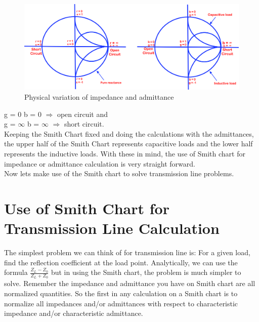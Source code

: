\begin{figure}[h]
\centering
\includegraphics[width=1.0\linewidth]{./graphics/jnbkvfld}
\caption{Physical variation of impedance and admittance}
\label{fig:jnbkvfld}
\end{figure}

g = 0 b = 0 $\Longrightarrow$ open circuit and\\
g = $\infty$  b = $\infty$ $\Longrightarrow$  short circuit.\\
Keeping the Smith Chart fixed and doing the calculations with the admittances, the upper half of the Smith Chart represents capacitive loads and the lower half represents the inductive loads. With these in mind, the use of Smith chart for impedance or admittance calculation is very straight forward.\\
Now lets make use of the Smith chart to solve transmission line problems. 

\section{Use of Smith Chart for Transmission Line Calculation}
The simplest problem we can think of for transmission line is: For a given load, find the reflection coefficient at the load point. Analytically, we can use the formula $\frac{Z_L - Z_0}{Z_L + Z_0}$ but in using the Smith chart, the problem is much simpler to solve. Remember the impedance and admittance you have on Smith chart are all normalized quantities. So the first in any calculation on a Smith chart is to normalize all impedances and/or admittances with respect to characteristic impedance and/or characteristic admittance.


